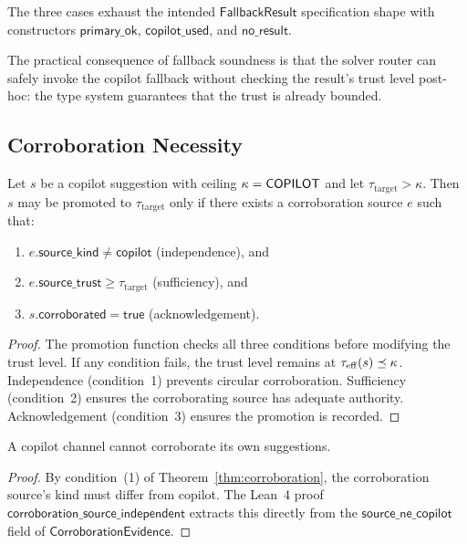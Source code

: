 \documentclass[11pt]{article}
\begin{document}
The three cases exhaust the intended $\mathsf{FallbackResult}$
specification shape with constructors
$\mathsf{primary\_ok}$, $\mathsf{copilot\_used}$, and
$\mathsf{no\_result}$.

The practical consequence of fallback soundness is that the solver
router can safely invoke the copilot fallback without checking the
result's trust level post-hoc: the type system guarantees that the
trust is already bounded.

\subsection{Corroboration Necessity}\label{sec:thm-corroboration}

\begin{theorem}\label{thm:corroboration}
Let $s$ be a copilot suggestion with ceiling $\kappa = \mathsf{COPILOT}$
and let $\tau_{\mathrm{target}} > \kappa$.  Then $s$ may be
promoted to $\tau_{\mathrm{target}}$ only if there exists a
corroboration source $e$ such that:
\begin{enumerate}
  \item $e.\mathsf{source\_kind} \ne \mathsf{copilot}$
    (independence), and
  \item $e.\mathsf{source\_trust} \geq \tau_{\mathrm{target}}$
    (sufficiency), and
  \item $s.\mathsf{corroborated} = \mathsf{true}$
    (acknowledgement).
\end{enumerate}
\end{theorem}

\begin{proof}
The promotion function checks all three conditions before modifying
the trust level.  If any condition fails, the trust level remains
at $\tau_{\mathrm{eff}}(s) \preceq \kappa$.  Independence (condition~1)
prevents circular corroboration.  Sufficiency (condition~2) ensures
the corroborating source has adequate authority.  Acknowledgement
(condition~3) ensures the promotion is recorded.
\end{proof}

\begin{corollary}\label{cor:no-circular}
A copilot channel cannot corroborate its own suggestions.
\end{corollary}

\begin{proof}
By condition~(1) of Theorem~\ref{thm:corroboration}, the
corroboration source's kind must differ from copilot.  The Lean~4
proof $\mathsf{corroboration\_source\_independent}$ extracts this
directly from the $\mathsf{source\_ne\_copilot}$ field of
$\mathsf{CorroborationEvidence}$.
\end{proof}
\end{document}
